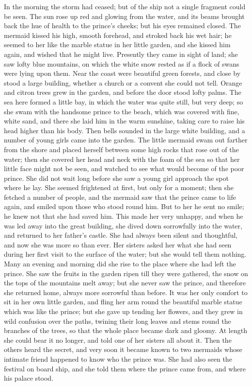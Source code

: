 In the morning the storm had ceased; but of the ship not a
single fragment could be seen. 
The sun rose up red and glowing from
the water, and its beams brought back the hue of health to the
prince's cheeks; but his eyes remained closed. 
The mermaid kissed
his high, smooth forehead, and stroked back his wet hair; he seemed to
her like the marble statue in her little garden, and she kissed him
again, and wished that he might live. 
Presently they came in sight
of land; she saw lofty blue mountains, on which the white snow
rested as if a flock of swans were lying upon them. 
Near the coast
were beautiful green forests, and close by stood a large building,
whether a church or a convent she could not tell. 
Orange and citron
trees grew in the garden, and before the door stood lofty palms. 
The
sea here formed a little bay, in which the water was quite still,
but very deep; so she swam with the handsome prince to the beach,
which was covered with fine, white sand, and there she laid him in the
warm sunshine, taking care to raise his head higher than his body.
Then bells sounded in the large white building, and a number of
young girls came into the garden. 
The little mermaid swam out
farther from the shore and placed herself between some high rocks that
rose out of the water; then she covered her head and neck with the
foam of the sea so that her little face might not be seen, and watched
to see what would become of the poor prince. 
She did not wait long
before she saw a young girl approach the spot where he lay. 
She seemed
frightened at first, but only for a moment; then she fetched a
number of people, and the mermaid saw that the prince came to life
again, and smiled upon those who stood round him. 
But to her he sent
no smile; he knew not that she had saved him. 
This made her very
unhappy, and when he was led away into the great building, she dived
down sorrowfully into the water, and returned to her father's
castle. 
She had always been silent and thoughtful, and now she was
more so than ever. 
Her sisters asked her what she had seen during
her first visit to the surface of the water; but she would tell them
nothing. 
Many an evening and morning did she rise to the place where
she had left the prince. 
She saw the fruits in the garden ripen till
they were gathered, the snow on the tops of the mountains melt away;
but she never saw the prince, and therefore she returned home,
always more sorrowful than before. 
It was her only comfort to sit in
her own little garden, and fling her arm round the beautiful marble
statue which was like the prince; but she gave up tending her flowers,
and they grew in wild confusion over the paths, twining their long
leaves and stems round the branches of the trees, so that the whole
place became dark and gloomy. 
At length she could bear it no longer,
and told one of her sisters all about it. 
Then the others heard the
secret, and very soon it became known to two mermaids whose intimate
friend happened to know who the prince was. 
She had also seen the
festival on board ship, and she told them where the prince came
from, and where his palace stood.


